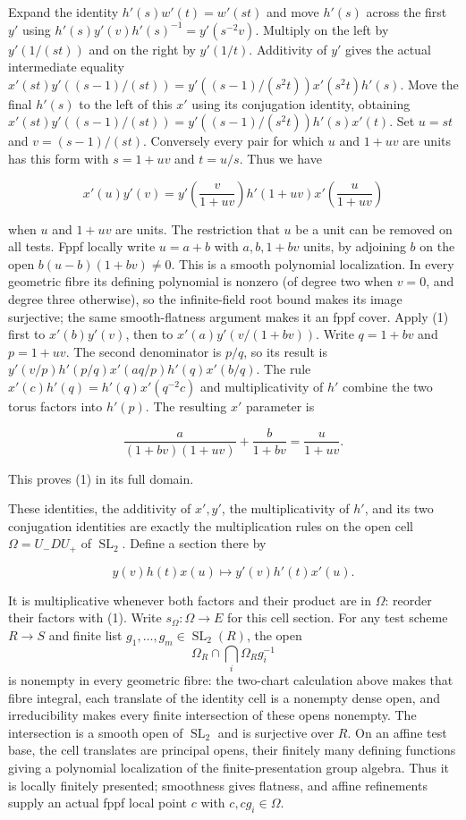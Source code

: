 \documentclass[11pt,a4paper,openany]{report}
\newcounter{none}
\begin{document}
Expand the identity \(h'(s)w'(t)=w'(st)\) and move \(h'(s)\) across the first \(y'\) using \(h'(s)y'(v)h'(s)^{-1}=y'(s^{-2}v)\). Multiply on the left by \(y'(1/(st))\) and on the right by \(y'(1/t)\). Additivity of \(y'\) gives the actual intermediate equality \(x'(st)y'((s-1)/(st))=y'((s-1)/(s^2t))x'(s^2t)h'(s)\). Move the final \(h'(s)\) to the left of this \(x'\) using its conjugation identity, obtaining \(x'(st)y'((s-1)/(st))=y'((s-1)/(s^2t))h'(s)x'(t)\). Set \(u=st\) and \(v=(s-1)/(st)\). Conversely every pair for which \(u\) and \(1+uv\) are units has this form with \(s=1+uv\) and \(t=u/s\). Thus we have

\[
x'(u)y'(v)=y'\left(\frac{v}{1+uv}\right)
h'(1+uv)x'\left(\frac{u}{1+uv}\right)
\tag{1}
\]

when \(u\) and \(1+uv\) are units. The restriction that \(u\) be a unit can be removed on all tests. Fppf locally write \(u=a+b\) with \(a,b,1+bv\) units, by adjoining \(b\) on the open \(b(u-b)(1+bv)\ne0\). This is a smooth polynomial localization. In every geometric fibre its defining polynomial is nonzero (of degree two when \(v=0\), and degree three otherwise), so the infinite-field root bound makes its image surjective; the same smooth-flatness argument makes it an fppf cover. Apply (1) first to \(x'(b)y'(v)\), then to \(x'(a)y'(v/(1+bv))\). Write \(q=1+bv\) and \(p=1+uv\). The second denominator is \(p/q\), so its result is \(y'(v/p)h'(p/q)x'(aq/p)h'(q)x'(b/q)\). The rule \(x'(c)h'(q)=h'(q)x'(q^{-2}c)\) and multiplicativity of \(h'\) combine the two torus factors into \(h'(p)\). The resulting \(x'\) parameter is

\[
\frac{a}{(1+bv)(1+uv)}+\frac{b}{1+bv}
=\frac{u}{1+uv}.
\]

This proves (1) in its full domain.

These identities, the additivity of \(x',y'\), the multiplicativity of \(h'\), and its two conjugation identities are exactly the multiplication rules on the open cell \(\Omega=U_-DU_+\) of \(\operatorname{SL}_2\). Define a section there by

\[
y(v)h(t)x(u)\longmapsto y'(v)h'(t)x'(u).
\]

It is multiplicative whenever both factors and their product are in \(\Omega\): reorder their factors with (1). Write \(s_\Omega:\Omega\to E\) for this cell section. For any test scheme \(R\to S\) and finite list \(g_1,\ldots,g_m\in\operatorname{SL}_2(R)\), the open \[
\Omega_R\cap\bigcap_i\Omega_Rg_i^{-1}
\] is nonempty in every geometric fibre: the two-chart calculation above makes that fibre integral, each translate of the identity cell is a nonempty dense open, and irreducibility makes every finite intersection of these opens nonempty. The intersection is a smooth open of \(\operatorname{SL}_2\) and is surjective over \(R\). On an affine test base, the cell translates are principal opens, their finitely many defining functions giving a polynomial localization of the finite-presentation group algebra. Thus it is locally finitely presented; smoothness gives flatness, and affine refinements supply an actual fppf local point \(c\) with \(c,cg_i\in\Omega\).
\end{document}
